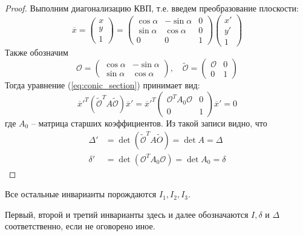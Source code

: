 \begin{proof}
	Выполним диагонализацию КВП, т.е. введем преобразование плоскости:
	\begin{equation*}
		\overline{x} = \left(\begin{array}{c}
		x \\ 
		y \\ 
		1
		\end{array}\right) = \left(\begin{array}{ccc}
		\cos \alpha & -\sin \alpha & 0 \\ 
		\sin \alpha & \cos \alpha & 0 \\ 
		0 & 0 & 1
		\end{array}\right) \left(\begin{array}{c}
		x' \\ 
		y' \\ 
		1
		\end{array}\right)
	\end{equation*}
	Также обозначим 
	\[\mathcal{O} = \left(\begin{array}{cc}
	\cos \alpha & -\sin \alpha \\ 
	\sin \alpha & \cos \alpha
	\end{array}\right), \quad \widetilde{\mathcal{O}} = \left(\begin{array}{c|c}
	\mathcal{O} & 0 \\ 
	\hline
	0 & 1
	\end{array}\right)\]
	Тогда уравнение (\ref{eq:conic_section}) принимает вид:
	\[\overline{x}'^T \left(\widetilde{\mathcal{O}}^T A \widetilde{\mathcal{O}}\right) \overline{x}' = \overline{x}'^T \left(\begin{array}{c|c}
	\mathcal{O}^T A_0 \mathcal{O} & 0 \\
	\hline
	0 & 1
	\end{array}\right) \overline{x}' = 0\]
	где $A_0$ -- матрица старших коэффициентов.
	Из такой записи видно, что
	\begin{align*}
		\Delta' &= \det \left(\widetilde{\mathcal{O}}^T A \widetilde{O}\right) = \det A = \Delta \\
		\delta' &= \det \left(\mathcal{O}^T A_0 \mathcal{O}\right) = \det A_0 = \delta
	\end{align*}
\end{proof}

\begin{Prop}
	Все остальные инварианты порождаются $I_1, I_2, I_3$. 
\end{Prop}

\begin{Rem}
	Первый, второй и третий инварианты здесь и далее обозначаются $I, \delta$ и $\Delta$ соответственно, если не оговорено иное.
\end{Rem}

